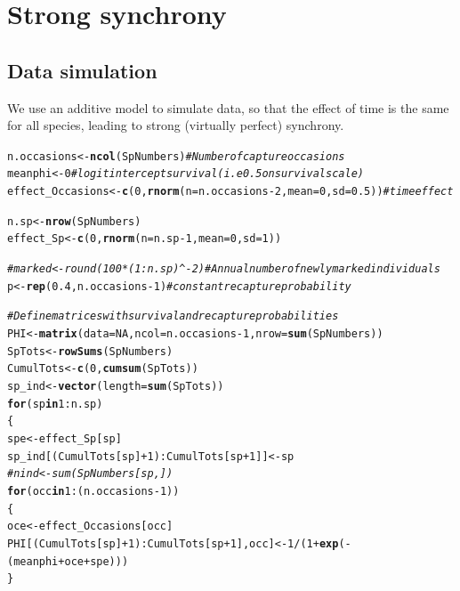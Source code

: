 \documentclass[a4paper, 10pt]{scrartcl}\usepackage[]{graphicx}\usepackage[]{color}
\makeatletter
\newcommand{\hlnum}[1]{\textcolor[rgb]{0.686,0.059,0.569}{#1}}%
\newcommand{\hlcom}[1]{\textcolor[rgb]{0.678,0.584,0.686}{\textit{#1}}}%
\newcommand{\hlopt}[1]{\textcolor[rgb]{0,0,0}{#1}}%
\newcommand{\hlstd}[1]{\textcolor[rgb]{0.345,0.345,0.345}{#1}}%
\newcommand{\hlkwa}[1]{\textcolor[rgb]{0.161,0.373,0.58}{\textbf{#1}}}%
\newcommand{\hlkwb}[1]{\textcolor[rgb]{0.69,0.353,0.396}{#1}}%
\newcommand{\hlkwc}[1]{\textcolor[rgb]{0.333,0.667,0.333}{#1}}%
\newcommand{\hlkwd}[1]{\textcolor[rgb]{0.737,0.353,0.396}{\textbf{#1}}}%
\newenvironment{kframe}{%
 \def\at@end@of@kframe{}%
 \ifinner\ifhmode%
  \def\at@end@of@kframe{\end{minipage}}%
  \begin{minipage}{\columnwidth}%
 \fi\fi%
 \def\FrameCommand##1{\hskip\@totalleftmargin \hskip-\fboxsep
 \colorbox{shadecolor}{##1}\hskip-\fboxsep
     \hskip-\linewidth \hskip-\@totalleftmargin \hskip\columnwidth}%
 \MakeFramed {\advance\hsize-\width
   \@totalleftmargin\z@ \linewidth\hsize
   \@setminipage}}%
 {\par\unskip\endMakeFramed%
 \at@end@of@kframe}
\newenvironment{knitrout}{}{} %
\makeatother
\begin{document}
\section{Strong synchrony}

\subsection{Data simulation}

We use an additive model to simulate data, so that the effect of time is the same for all species, leading to strong (virtually perfect) synchrony. 

\begin{knitrout}
\color{fgcolor}\begin{kframe}
\begin{alltt}
\hlstd{n.occasions} \hlkwb{<-} \hlkwd{ncol}\hlstd{(SpNumbers)}  \hlcom{# Number of capture occasions}
\hlstd{meanphi} \hlkwb{<-} \hlnum{0} \hlcom{#logit intercept survival (i.e 0.5 on survival scale)}
\hlstd{effect_Occasions}\hlkwb{<-}\hlkwd{c}\hlstd{(}\hlnum{0}\hlstd{,}\hlkwd{rnorm}\hlstd{(}\hlkwc{n} \hlstd{= n.occasions}\hlopt{-}\hlnum{2}\hlstd{,}\hlkwc{mean} \hlstd{=} \hlnum{0}\hlstd{,}\hlkwc{sd} \hlstd{=} \hlnum{0.5}\hlstd{))}\hlcom{#time effect}

\hlstd{n.sp} \hlkwb{<-} \hlkwd{nrow}\hlstd{(SpNumbers)}
\hlstd{effect_Sp}\hlkwb{<-}\hlkwd{c}\hlstd{(}\hlnum{0}\hlstd{,}\hlkwd{rnorm}\hlstd{(}\hlkwc{n} \hlstd{= n.sp}\hlopt{-}\hlnum{1}\hlstd{,}\hlkwc{mean}\hlstd{=}\hlnum{0}\hlstd{,}\hlkwc{sd}\hlstd{=}\hlnum{1}\hlstd{))}


\hlcom{#marked <- round(100*(1:n.sp)^-2)   # Annual number of newly marked individuals}
\hlstd{p} \hlkwb{<-} \hlkwd{rep}\hlstd{(}\hlnum{0.4}\hlstd{, n.occasions}\hlopt{-}\hlnum{1}\hlstd{)}\hlcom{#constant recapture probability}

\hlcom{# Define matrices with survival and recapture probabilities}
\hlstd{PHI} \hlkwb{<-} \hlkwd{matrix}\hlstd{(} \hlkwc{data} \hlstd{=} \hlnum{NA}\hlstd{,} \hlkwc{ncol} \hlstd{= n.occasions}\hlopt{-}\hlnum{1}\hlstd{,} \hlkwc{nrow} \hlstd{=} \hlkwd{sum}\hlstd{( SpNumbers) )}
\hlstd{SpTots} \hlkwb{<-} \hlkwd{rowSums}\hlstd{(SpNumbers)}
\hlstd{CumulTots} \hlkwb{<-} \hlkwd{c}\hlstd{(}\hlnum{0}\hlstd{,} \hlkwd{cumsum}\hlstd{(SpTots))}
\hlstd{sp_ind} \hlkwb{<-} \hlkwd{vector}\hlstd{(}\hlkwc{length} \hlstd{=} \hlkwd{sum}\hlstd{(SpTots))}
\hlkwa{for} \hlstd{(sp} \hlkwa{in} \hlnum{1}\hlopt{:}\hlstd{n.sp)}
\hlstd{\{}
  \hlstd{spe} \hlkwb{<-}  \hlstd{effect_Sp[sp]}
  \hlstd{sp_ind[(CumulTots[sp]}\hlopt{+}\hlnum{1}\hlstd{)}\hlopt{:}\hlstd{CumulTots[sp}\hlopt{+}\hlnum{1}\hlstd{]]} \hlkwb{<-} \hlstd{sp}
  \hlcom{#nind <- sum(SpNumbers[sp,])}
  \hlkwa{for} \hlstd{(occ} \hlkwa{in} \hlnum{1}\hlopt{:}\hlstd{(n.occasions}\hlopt{-}\hlnum{1}\hlstd{))}
  \hlstd{\{}
    \hlstd{oce} \hlkwb{<-} \hlstd{effect_Occasions[occ]}
    \hlstd{PHI[(CumulTots[sp]}\hlopt{+}\hlnum{1}\hlstd{)}\hlopt{:}\hlstd{CumulTots[sp}\hlopt{+}\hlnum{1}\hlstd{],occ]} \hlkwb{<-} \hlnum{1}\hlopt{/}\hlstd{(}\hlnum{1}\hlopt{+}\hlkwd{exp}\hlstd{(}\hlopt{-}\hlstd{( meanphi} \hlopt{+} \hlstd{oce} \hlopt{+} \hlstd{spe) ) )}
  \hlstd{\}}


\end{alltt}
\end{kframe}
\end{knitrout}
\end{document}
